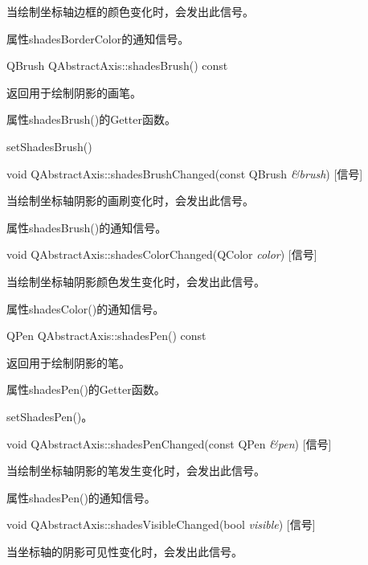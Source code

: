 当绘制坐标轴边框的颜色变化时，会发出此信号。  

\begin{notice}
属性shadesBorderColor的通知信号。
\end{notice}

QBrush QAbstractAxis::shadesBrush() const 

返回用于绘制阴影的画笔。

\begin{notice}
属性shadesBrush()的Getter函数。
\end{notice}
        
\begin{seeAlso}
setShadesBrush()
\end{seeAlso}

void QAbstractAxis::shadesBrushChanged(const QBrush \emph{\&brush}) [信号] 

当绘制坐标轴阴影的画刷变化时，会发出此信号。 

\begin{notice}
属性shadesBrush()的通知信号。
\end{notice}

void QAbstractAxis::shadesColorChanged(QColor \emph{color}) [信号] 

当绘制坐标轴阴影颜色发生变化时，会发出此信号。 

\begin{notice}
属性shadesColor()的通知信号。
\end{notice}

QPen QAbstractAxis::shadesPen() const 

返回用于绘制阴影的笔。

\begin{notice}
属性shadesPen()的Getter函数。
\end{notice}
    
\begin{seeAlso}
setShadesPen()。
\end{seeAlso}

void QAbstractAxis::shadesPenChanged(const QPen \emph{\&pen}) [信号] 

当绘制坐标轴阴影的笔发生变化时，会发出此信号。

\begin{notice}
属性shadesPen()的通知信号。
\end{notice}

void QAbstractAxis::shadesVisibleChanged(bool \emph{visible}) [信号] 

当坐标轴的阴影可见性变化时，会发出此信号。

